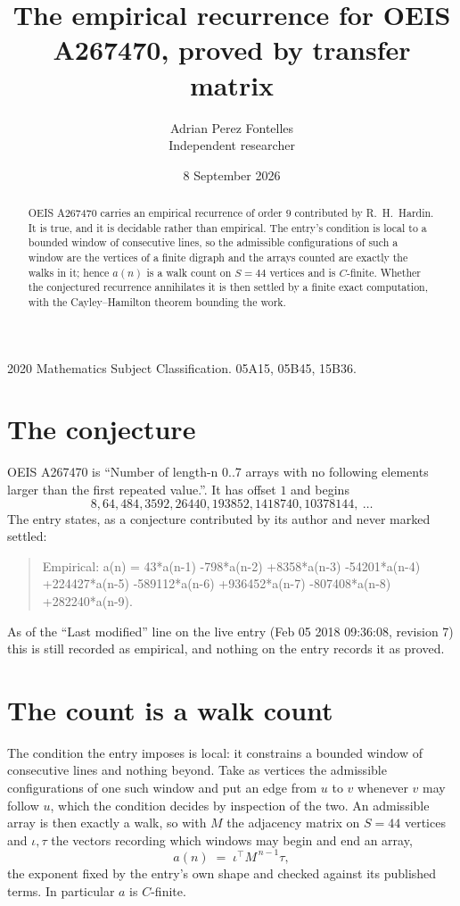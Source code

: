 \documentclass[11pt,a4paper]{article}
\title{The empirical recurrence for OEIS A267470, proved by transfer matrix}
\author{Adrian Perez Fontelles\\ \small Independent researcher}
\date{8 September 2026}
\theoremstyle{plain}
\theoremstyle{definition}
\begin{document}
\maketitle

\begin{abstract}
OEIS A267470 carries an empirical recurrence of order $9$ contributed by R.~H.~Hardin. It is
true, and it is decidable rather than empirical. The entry's condition is local to a bounded window of consecutive lines, so
the admissible configurations of such a window are the vertices of a finite digraph and the
arrays counted are exactly the walks in it; hence $a(n)$ is a walk count on $S=44$ vertices
and is $C$-finite. Whether the conjectured recurrence annihilates it is then settled by a
finite exact computation, with the Cayley--Hamilton theorem bounding the work.
\end{abstract}

\noindent\small 2020 Mathematics Subject Classification. 05A15, 05B45, 15B36.\normalsize

\section{The conjecture}

OEIS A267470 is ``Number of length-n 0..7 arrays with no following elements larger than the first repeated value.''. It has offset $1$ and begins
\[
8, 64, 484, 3592, 26440, 193852, 1418740, 10378144,\ \dots
\]
The entry states, as a conjecture contributed by its author and never marked settled:
\begin{quote}
Empirical: a(n) = 43*a(n-1) -798*a(n-2) +8358*a(n-3) -54201*a(n-4) +224427*a(n-5) -589112*a(n-6) +936452*a(n-7) -807408*a(n-8) +282240*a(n-9).
\end{quote}
As of the ``Last modified'' line on the live entry (Feb 05 2018 09:36:08, revision 7) this is still
recorded as empirical, and nothing on the entry records it as proved.

\section{The count is a walk count}

The condition the entry imposes is local: it constrains a bounded window of consecutive lines and nothing beyond. Take as
vertices the admissible configurations of one such window and put an edge from $u$ to $v$
whenever $v$ may follow $u$, which the condition decides by inspection of the two. An
admissible array is then exactly a walk, so with $M$ the adjacency matrix on $S=44$ vertices
and $\iota,\tau$ the vectors recording which windows may begin and end an array,
\[
a(n)\;=\;\iota^{\!\top}M^{\,n-1}\tau ,
\]
the exponent fixed by the entry's own shape and checked against its published terms. In
particular $a$ is $C$-finite.
\end{document}
